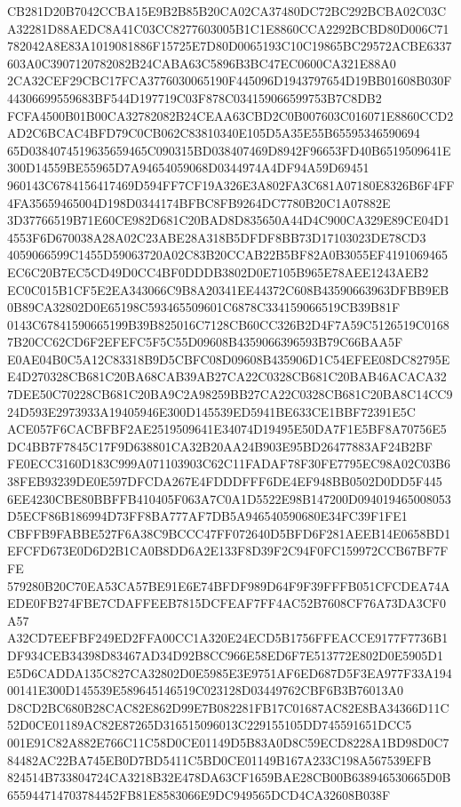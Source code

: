 \documentclass[UTF8,fontset=fandol,zihao=-4,a4paper]{ctexart}
\begin{document}
{{CB281D20B7042CCBA15E9B2B85B20CA02CA37480DC72BC292BCBA02C03CA32281D88AEDC8A41C03CC8277603005B1C1E8860CCA2292BCBD80D006C71
782042A8E83A1019081886F15725E7D80D0065193C10C19865BC29572ACBE6337603A0C3907120782082B24CABA63C5896B3BC47EC0600CA321E88A0
2CA32CEF29CBC17FCA3776030065190F445096D1943797654D19BB01608B030F44306699559683BF544D197719C03F878C034159066599753B7C8DB2
FCFA4500B01B00CA32782082B24CEAA63CBD2C0B007603C016071E8860CCD2AD2C6BCAC4BFD79C0CB062C83810340E105D5A35E55B65595346590694
65D0384074519635659465C090315BD038407469D8942F96653FD40B6519509641E300D14559BE55965D7A94654059068D0344974A4DF94A59D69451
960143C6784156417469D594FF7CF19A326E3A802FA3C681A07180E8326B6F4FF4FA35659465004D198D0344174BFBC8FB9264DC7780B20C1A07882E
3D37766519B71E60CE982D681C20BAD8D835650A44D4C900CA329E89CE04D14553F6D670038A28A02C23ABE28A318B5DFDF8BB73D17103023DE78CD3
4059066599C1455D59063720A02C83B20CCAB22B5BF82A0B3055EF4191069465EC6C20B7EC5CD49D0CC4BF0DDDB3802D0E7105B965E78AEE1243AEB2
EC0C015B1CF5E2EA343066C9B8A20341EE44372C608B43590663963DFBB9EB0B89CA32802D0E65198C593465509601C6878C334159066519CB39B81F
0143C67841590665199B39B825016C7128CB60CC326B2D4F7A59C5126519C01687B20CC62CD6F2EFEFC5F5C55D09608B4359066396593B79C66BAA5F
E0AE04B0C5A12C83318B9D5CBFC08D09608B435906D1C54EFEE08DC82795EE4D270328CB681C20BA68CAB39AB27CA22C0328CB681C20BAB46ACACA32
7DEE50C70228CB681C20BA9C2A98259BB27CA22C0328CB681C20BA8C14CC924D593E2973933A19405946E300D145539ED5941BE633CE1BBF72391E5C
ACE057F6CACBFBF2AE2519509641E34074D19495E50DA7F1E5BF8A70756E5DC4BB7F7845C17F9D638801CA32B20AA24B903E95BD26477883AF24B2BF
FE0ECC3160D183C999A071103903C62C11FADAF78F30FE7795EC98A02C03B638FEB93239DE0E597DFCDA267E4FDDDFFF6DE4EF948BB0502D0DD5F445
6EE4230CBE80BBFFB410405F063A7C0A1D5522E98B147200D094019465008053D5ECF86B186994D73FF8BA777AF7DB5A946540590680E34FC39F1FE1
CBFFB9FABBE527F6A38C9BCCC47FF072640D5BFD6F281AEEB14E0658BD1EFCFD673E0D6D2B1CA0B8DD6A2E133F8D39F2C94F0FC159972CCB67BF7FFE
579280B20C70EA53CA57BE91E6E74BFDF989D64F9F39FFFB051CFCDEA74AEDE0FB274FBE7CDAFFEEB7815DCFEAF7FF4AC52B7608CF76A73DA3CF0A57
A32CD7EEFBF249ED2FFA00CC1A320E24ECD5B1756FFEACCE9177F7736B1DF934CEB34398D83467AD34D92B8CC966E58ED6F7E513772E802D0E5905D1
E5D6CADDA135C827CA32802D0E5985E3E9751AF6ED687D5F3EA977F33A19400141E300D145539E589645146519C023128D03449762CBF6B3B76013A0
D8CD2BC680B28CAC82E862D99E7B082281FB17C01687AC82E8BA34366D11C52D0CE01189AC82E87265D316515096013C229155105DD745591651DCC5
001E91C82A882E766C11C58D0CE01149D5B83A0D8C59ECD8228A1BD98D0C784482AC22BA745EB0D7BD5411C5BD0CE01149B167A233C198A567539EFB
824514B733804724CA3218B32E478DA63CF1659BAE28CB00B638946530665D0B655944714703784452FB81E8583066E9DC949565DCD4CA32608B038F
}}
\end{document}
